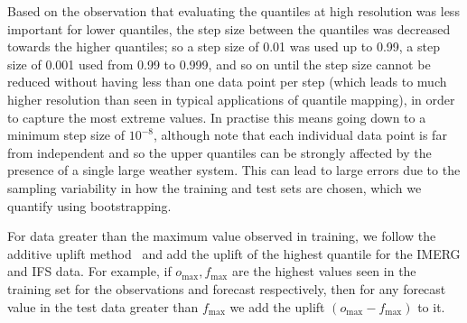 \documentclass{article}
\begin{document}
Based on the observation that evaluating the quantiles at high resolution was less important for lower quantiles, the step size between the quantiles was decreased towards the higher quantiles; so a step size of 0.01 was used up to 0.99, a step size of 0.001 used from 0.99 to 0.999, and so on until the step size cannot be reduced without having less than one data point per step (which leads to much higher resolution than seen in typical applications of quantile mapping), in order to capture the most extreme values. In practise this means going down to a minimum step size of $10^{-8}$, although note that each individual data point is far from independent and so the upper quantiles can be strongly affected by the presence of a single large weather system. This can lead to large errors due to the sampling variability in how the training and test sets are chosen, which we quantify using bootstrapping.



For data greater than the maximum value observed in training, we follow the additive uplift method~\citep{boe_statistical_2007, deque_frequency_2007} and add the uplift of the highest quantile for the IMERG and IFS data. For example, if $o_{\text{max}},f_{\text{max}}$ are the highest values seen in the training set for the observations and forecast respectively, then for any forecast value in the test data greater than $f_{\text{max}}$ we add the uplift $(o_{\text{max}} - f_{\text{max}})$ to it. 
\end{document}
